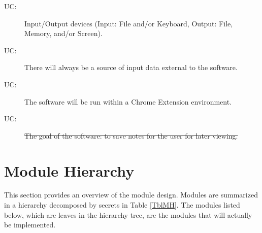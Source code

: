 \documentclass[12pt, titlepage]{article}
\newcounter{ucnum}
\newcommand{\uctheucnum}{UC\theucnum}
\begin{document}
\begin{description}
\item[ \uctheucnum \label{ucIO}:] Input/Output devices
  (Input: File and/or Keyboard, Output: File, Memory, and/or Screen).
\item[ \uctheucnum \label{ucInput}:] There will always be
  a source of input data external to the software.
\item[ \uctheucnum \label{ucChrome}:] The software will 
  be run within a Chrome Extension environment.
  
\item[ \uctheucnum \label{ucGoal}:] \sout{The goal of the 
	software: to save notes for the user for later viewing. }
\end{description}

\section{Module Hierarchy} \label{SecMH}

This section provides an overview of the module design. Modules are summarized
in a hierarchy decomposed by secrets in Table \ref{TblMH}. The modules listed
below, which are leaves in the hierarchy tree, are the modules that will
actually be implemented.
\end{document}
